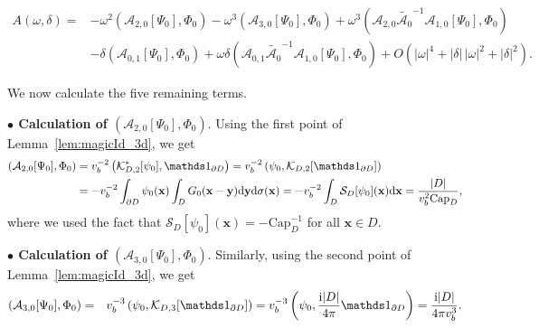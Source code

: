 \documentclass[11pt]{article}
\numberwithin{equation}{section}
\def\bx{{\mathbf{x}}}
\def\by{{\mathbf{y}}}
\def\rd{{\mathrm{d}}}
\def\ri{{\mathrm{i}}}
\def\cS{{\mathcal{S}}}
\def\capacity{{\mathrm{Cap}}}
\newcommand\1{{\ensuremath {\mathds 1} }}
\def\beas{\begin{eqnarray*}} \def\eeas{\end{eqnarray*}}
\begin{document}
\begin{equation} \label{eq:simplificationA}
\begin{aligned}
A(\omega, \delta) = & 
-\omega^2 \left( \mathcal{A}_{2,0}[\Psi_0], \Phi_0\right)-\omega^3 \left( \mathcal{A}_{3,0}[\Psi_0], \Phi_0\right) +  \omega^3 \left( \mathcal{A}_{2,0}\tilde{\mathcal{A}_0}^{-1}\mathcal{A}_{1,0}[\Psi_0], \Phi_0\right) 
\\
&    -\delta \left( \mathcal{A}_{0,1}[\Psi_0], \Phi_0\right)  + \omega \delta \left( \mathcal{A}_{0,1}\tilde{\mathcal{A}_0}^{-1}\mathcal{A}_{1,0}[\Psi_0], \Phi_0\right) + O( | \omega |^4 + | \delta | \, |\omega|^2  + | \delta |^2).
\end{aligned}
\end{equation}

We now calculate the five remaining terms.

\medskip

\noindent \textbf{$\bullet$ Calculation of $\left( \mathcal{A}_{2,0}[\Psi_0], \Phi_0\right)$}. Using the first point of Lemma~\ref{lem:magicId_3d}, we get
\begin{align*}
\left( \mathcal{A}_{2,0}[\Psi_0], \Phi_0\right)&=v_b^{-2}
\left( \mathcal{K}_{D, 2}^*[\psi_0], \1_{\p D} \right)=  v_b^{-2}
\left( \psi_0, \mathcal{K}_{D, 2}[\1_{\p D}] \right) \\
	& =  - v_b^{-2} \int_{\p D} \psi_0(\bx) \int_D G_0(\bx - \by) \rd \by \rd \sigma(\bx) = - v_b^{-2}  \int_D \cS_D[\psi_0] (\bx) \rd \bx = \dfrac{| D |}{v_b^2 \capacity_D},
\end{align*}
where we used the fact that $ \cS_D[\psi_0] (\bx) = - \capacity_D^{-1}$ for all $\bx \in D$.

\medskip

\noindent \textbf{$\bullet$ Calculation of $\left( \mathcal{A}_{3,0}[\Psi_0], \Phi_0\right)$}. Similarly, using the second point of Lemma~\ref{lem:magicId_3d}, we get
\beas
\left( \mathcal{A}_{3,0}[\Psi_0], \Phi_0\right)&=& v_b^{-3}
\left( \psi_0, \mathcal{K}_{D, 3}[\1_{\p D}] \right)
= v_b^{-3} \left( \psi_0,  \f{\ri | D |}{4\pi} \1_{\p D} \right) =  \f{\ri | D |}{4\pi v_b^3}.
\eeas
\end{document}
